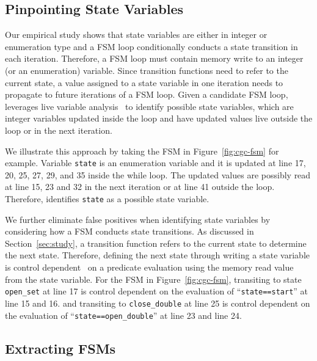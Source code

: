 \subsection{Pinpointing State Variables}

Our empirical study shows that state variables are either in integer or enumeration type
and a FSM loop conditionally conducts a state transition in each iteration. 
Therefore, a FSM loop must contain memory write to an integer 
(or an enumeration) variable. 
Since transition functions need to refer to the current state, 
a value assigned to a state variable in one iteration needs 
to propagate to future iterations of a FSM loop. 
Given a candidate FSM loop, \Tool{} leverages live variable 
analysis~\cite{live-analysis} to 
identify possible state variables, which are integer variables 
updated inside the loop and have updated values live outside the loop 
or in the next iteration. 

We illustrate this approach by taking the FSM 
in Figure~\ref{fig:cgc-fsm} for example. 
Variable \texttt{state} is an enumeration variable and it is updated at 
line 17, 20, 25, 27, 29, and 35 inside the while loop. 
The updated values are possibly read at line 15, 23 and 32 
in the next iteration or at line 41 outside the loop.
Therefore, \Tool{} identifies \texttt{state} as a possible 
state variable.  


We further eliminate false positives when identifying state variables 
by considering how a FSM conducts state transitions. 
As discussed in Section~\ref{sec:study}, 
a transition function refers to the current state to determine the next state. 
Therefore, defining the next state through writing a state variable 
is control dependent~\cite{cdg} on a predicate evaluation using the memory read value
from the state variable. 
For the FSM in Figure~\ref{fig:cgc-fsm}, 
transiting to state \texttt{open\_set} at line 17
is control dependent on the evaluation of ``\texttt{state==start}'' at line 15 and 16. 
and transiting to \texttt{close\_double} at line 25 is control dependent on the 
evaluation of ``\texttt{state==open\_double}'' at line 23 and line 24. 




\subsection{Extracting FSMs}

